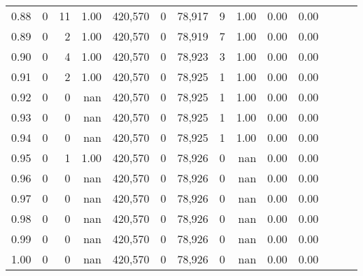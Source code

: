 \begin{tabular}{rrrrrrrrrrrrrr}
0.88 &       0 &     11 &  1.00 &  420,570 &        0 &  78,917 &       9 &  1.00 &  0.00 &      0.00 \\
0.89 &       0 &      2 &  1.00 &  420,570 &        0 &  78,919 &       7 &  1.00 &  0.00 &      0.00 \\
0.90 &       0 &      4 &  1.00 &  420,570 &        0 &  78,923 &       3 &  1.00 &  0.00 &      0.00 \\
0.91 &       0 &      2 &  1.00 &  420,570 &        0 &  78,925 &       1 &  1.00 &  0.00 &      0.00 \\
0.92 &       0 &      0 &   nan &  420,570 &        0 &  78,925 &       1 &  1.00 &  0.00 &      0.00 \\
0.93 &       0 &      0 &   nan &  420,570 &        0 &  78,925 &       1 &  1.00 &  0.00 &      0.00 \\
0.94 &       0 &      0 &   nan &  420,570 &        0 &  78,925 &       1 &  1.00 &  0.00 &      0.00 \\
0.95 &       0 &      1 &  1.00 &  420,570 &        0 &  78,926 &       0 &   nan &  0.00 &      0.00 \\
0.96 &       0 &      0 &   nan &  420,570 &        0 &  78,926 &       0 &   nan &  0.00 &      0.00 \\
0.97 &       0 &      0 &   nan &  420,570 &        0 &  78,926 &       0 &   nan &  0.00 &      0.00 \\
0.98 &       0 &      0 &   nan &  420,570 &        0 &  78,926 &       0 &   nan &  0.00 &      0.00 \\
0.99 &       0 &      0 &   nan &  420,570 &        0 &  78,926 &       0 &   nan &  0.00 &      0.00 \\
1.00 &       0 &      0 &   nan &  420,570 &        0 &  78,926 &       0 &   nan &  0.00 &      0.00 \\
\bottomrule
\end{tabular}
